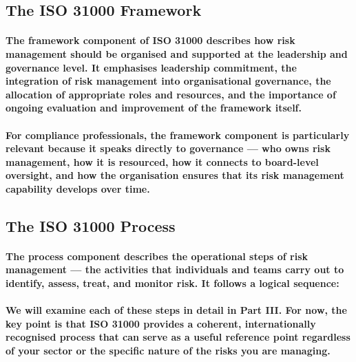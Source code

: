 \subsection{The ISO 31000 Framework}
\paragraph{The framework component of ISO 31000 describes how risk management should be organised and supported at the leadership and governance level. It emphasises leadership commitment, the integration of risk management into organisational governance, the allocation of appropriate roles and resources, and the importance of ongoing evaluation and improvement of the framework itself.}
\paragraph{For compliance professionals, the framework component is particularly relevant because it speaks directly to \textbf{governance} — who owns risk management, how it is resourced, how it connects to board-level oversight, and how the organisation ensures that its risk management capability develops over time.}
\subsection{The ISO 31000 Process}
\paragraph{The process component describes the operational steps of risk management — the activities that individuals and teams carry out to identify, assess, treat, and monitor risk. It follows a logical sequence:}
\begin{itemize}
\end{itemize}
\paragraph{We will examine each of these steps in detail in Part III. For now, the key point is that ISO 31000 provides a coherent, internationally recognised process that can serve as a useful reference point regardless of your sector or the specific nature of the risks you are managing.}

